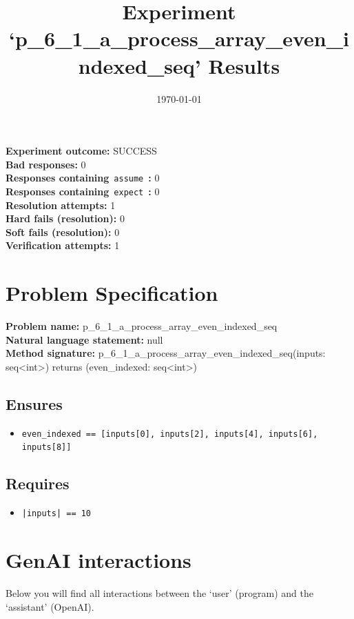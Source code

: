 \documentclass{article}
\begin{document}
\title{Experiment `p\_6\_1\_a\_process\_array\_even\_indexed\_seq' Results}
\author{\today}
\date{}
\maketitle
\textbf{Experiment outcome: }SUCCESS
\\\textbf{Bad responses: }0
\\\textbf{Responses containing}~\texttt{assume}~\textbf{: }0
\\\textbf{Responses containing}~\texttt{expect}~\textbf{: }0
\\\textbf{Resolution attempts: }1
\\\textbf{Hard fails (resolution): }0
\\\textbf{Soft fails (resolution): }0
\\\textbf{Verification attempts: }1
\section*{Problem Specification}
\textbf{Problem name: }p\_6\_1\_a\_process\_array\_even\_indexed\_seq
\\\textbf{Natural language statement: }null
\\\textbf{Method signature: }p\_6\_1\_a\_process\_array\_even\_indexed\_seq(inputs: seq<int>) returns (even\_indexed: seq<int>)
\subsection*{Ensures}
\begin{itemize}
\item \texttt{even\_indexed == [inputs[0], inputs[2], inputs[4], inputs[6], inputs[8]]}
\end{itemize}
\subsection*{Requires}
\begin{itemize}
\item \texttt{|inputs| == 10}
\end{itemize}
\clearpage
\section*{GenAI interactions}
Below you will find all interactions between the `user' (program) and the `assistant' (OpenAI).
\end{document}
